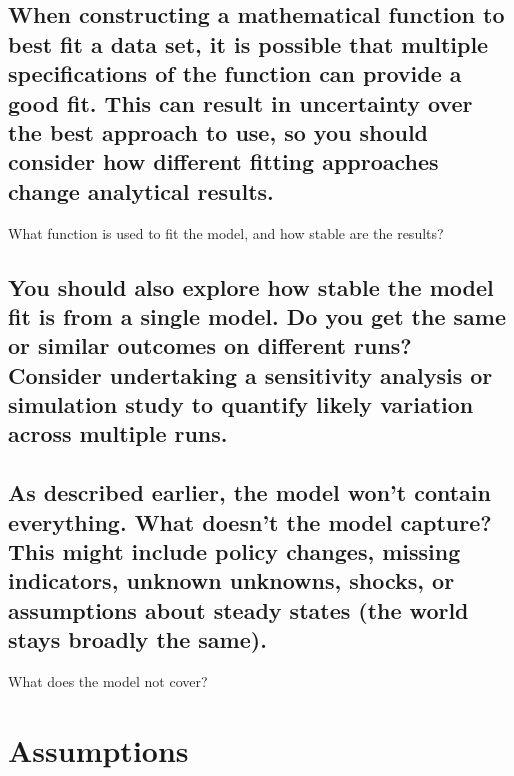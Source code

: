 \documentclass[]{book}
\begin{document}
\subsection{When constructing a mathematical function to best fit a data
set, it is possible that multiple specifications of the function can
provide a good fit. This can result in uncertainty over the best
approach to use, so you should consider how different fitting approaches
change analytical
results.}\label{when-constructing-a-mathematical-function-to-best-fit-a-data-set-it-is-possible-that-multiple-specifications-of-the-function-can-provide-a-good-fit.-this-can-result-in-uncertainty-over-the-best-approach-to-use-so-you-should-consider-how-different-fitting-approaches-change-analytical-results.}

 What function is used to fit the model, and how stable are the results?

\subsection{You should also explore how stable the model fit is from a
single model. Do you get the same or similar outcomes on different runs?
Consider undertaking a sensitivity analysis or simulation study to
quantify likely variation across multiple
runs.}\label{you-should-also-explore-how-stable-the-model-fit-is-from-a-single-model.-do-you-get-the-same-or-similar-outcomes-on-different-runs-consider-undertaking-a-sensitivity-analysis-or-simulation-study-to-quantify-likely-variation-across-multiple-runs.}

\subsection{As described earlier, the model won't contain everything.
What doesn't the model capture? This might include policy changes,
missing indicators, unknown unknowns, shocks, or assumptions about
steady states (the world stays broadly the
same).}\label{as-described-earlier-the-model-wont-contain-everything.-what-doesnt-the-model-capture-this-might-include-policy-changes-missing-indicators-unknown-unknowns-shocks-or-assumptions-about-steady-states-the-world-stays-broadly-the-same.}

 What does the model not cover?

\section{Assumptions}\label{assumptions}
\end{document}
